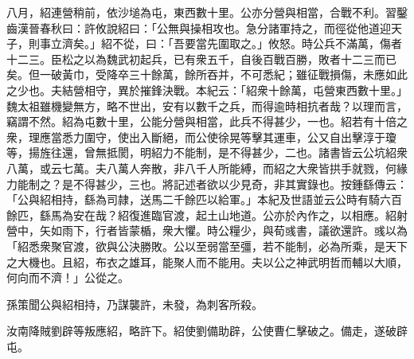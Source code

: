 \begin{pinyinscope}
八月，紹連營稍前，依沙塠為屯，東西數十里。公亦分營與相當，合戰不利。習鑿齒漢晉春秋曰：許攸說紹曰：「公無與操相攻也。急分諸軍持之，而徑從他道迎天子，則事立濟矣。」紹不從，曰：「吾要當先圍取之。」攸怒。時公兵不滿萬，傷者十二三。臣松之以為魏武初起兵，已有衆五千，自後百戰百勝，敗者十二三而已矣。但一破黃巾，受降卒三十餘萬，餘所吞并，不可悉紀；雖征戰損傷，未應如此之少也。夫結營相守，異於摧鋒決戰。本紀云：「紹衆十餘萬，屯營東西數十里。」魏太祖雖機變無方，略不世出，安有以數千之兵，而得逾時相抗者哉？以理而言，竊謂不然。紹為屯數十里，公能分營與相當，此兵不得甚少，一也。紹若有十倍之衆，理應當悉力圍守，使出入斷絕，而公使徐晃等擊其運車，公又自出擊淳于瓊等，揚旌往還，曾無抵閡，明紹力不能制，是不得甚少，二也。諸書皆云公坑紹衆八萬，或云七萬。夫八萬人奔散，非八千人所能縛，而紹之大衆皆拱手就戮，何緣力能制之？是不得甚少，三也。將記述者欲以少見奇，非其實錄也。按鍾繇傳云：「公與紹相持，繇為司隷，送馬二千餘匹以給軍。」本紀及世語並云公時有騎六百餘匹，繇馬為安在哉？紹復進臨官渡，起土山地道。公亦於內作之，以相應。紹射營中，矢如雨下，行者皆蒙楯，衆大懼。時公糧少，與荀彧書，議欲還許。彧以為「紹悉衆聚官渡，欲與公決勝敗。公以至弱當至彊，若不能制，必為所乘，是天下之大機也。且紹，布衣之雄耳，能聚人而不能用。夫以公之神武明哲而輔以大順，何向而不濟！」公從之。

孫策聞公與紹相持，乃謀襲許，未發，為刺客所殺。

汝南降賊劉辟等叛應紹，略許下。紹使劉備助辟，公使曹仁擊破之。備走，遂破辟屯。


\end{pinyinscope}
